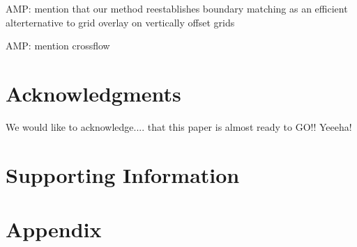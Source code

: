 \documentclass{article}
\begin{document}
{\color{red} AMP: mention that our method reestablishes boundary matching as an efficient alterternative to grid overlay on vertically offset grids}

{\color{red} AMP: mention crossflow}


\section{Acknowledgments}
We would like to acknowledge.... {\color{red} that this paper is almost ready to GO!! Yeeeha!}

\section{Supporting Information}

\section{Appendix}


\end{document}
